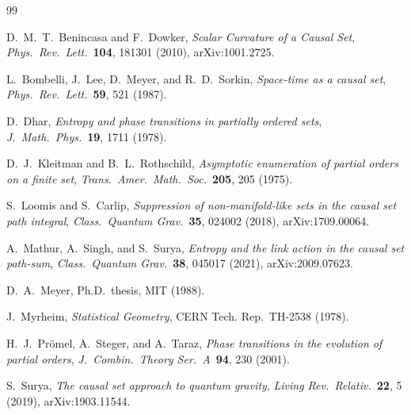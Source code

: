 \documentclass[12pt,a4paper]{article}
\begin{document}

\begin{thebibliography}{99}

D.~M.~T.~Benincasa and F.~Dowker,
\emph{Scalar Curvature of a Causal Set},
\emph{Phys.\ Rev.\ Lett.}\ \textbf{104}, 181301 (2010),
arXiv:1001.2725.

L.~Bombelli, J.~Lee, D.~Meyer, and R.~D.~Sorkin,
\emph{Space-time as a causal set},
\emph{Phys.\ Rev.\ Lett.}\ \textbf{59}, 521 (1987).

D.~Dhar,
\emph{Entropy and phase transitions in partially ordered sets},
\emph{J.\ Math.\ Phys.}\ \textbf{19}, 1711 (1978).

D.~J.~Kleitman and B.~L.~Rothschild,
\emph{Asymptotic enumeration of partial orders on a finite set},
\emph{Trans.\ Amer.\ Math.\ Soc.}\ \textbf{205}, 205 (1975).

S.~Loomis and S.~Carlip,
\emph{Suppression of non-manifold-like sets in the causal set path integral},
\emph{Class.\ Quantum Grav.}\ \textbf{35}, 024002 (2018),
arXiv:1709.00064.

A.~Mathur, A.~Singh, and S.~Surya,
\emph{Entropy and the link action in the causal set path-sum},
\emph{Class.\ Quantum Grav.}\ \textbf{38}, 045017 (2021),
arXiv:2009.07623.

D.~A.~Meyer,
Ph.D.\ thesis, MIT (1988).

J.~Myrheim,
\emph{Statistical Geometry},
CERN Tech. Rep.\ TH-2538 (1978).

H.~J.~Pr\"omel, A.~Steger, and A.~Taraz,
\emph{Phase transitions in the evolution of partial orders},
\emph{J.\ Combin.\ Theory Ser.\ A}\ \textbf{94}, 230 (2001).

S.~Surya,
\emph{The causal set approach to quantum gravity},
\emph{Living Rev.\ Relativ.}\ \textbf{22}, 5 (2019),
arXiv:1903.11544.

\end{thebibliography}
\end{document}
